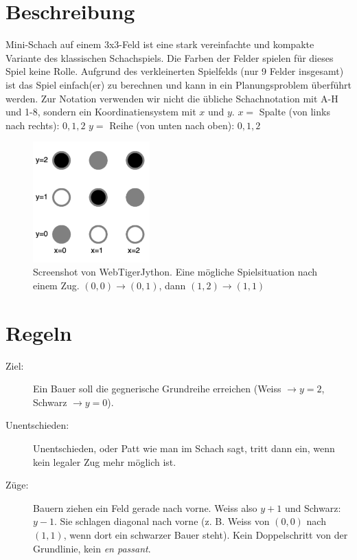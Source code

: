 \documentclass[a4paper,11pt,german,notitlepage]{report}
\begin{document}
\section*{Beschreibung}
Mini-Schach auf einem 3x3-Feld ist eine stark vereinfachte und kompakte Variante des klassischen Schachspiels.
Die Farben der Felder spielen für dieses Spiel keine Rolle.
Aufgrund des verkleinerten Spielfelds (nur 9 Felder insgesamt) ist das Spiel einfach(er) zu berechnen und kann in ein Planungsproblem überführt werden.
Zur Notation verwenden wir nicht die übliche Schachnotation mit A-H und 1-8, sondern ein Koordinatiensystem mit $x$ und $y$.
$x =$ Spalte (von links nach rechts): $0, 1, 2$
$y =$ Reihe (von unten nach oben): $0, 1, 2$

\begin{figure}[h!]
    \centering
    \includegraphics[width=4.5cm]{mini_chess.png}    
    \caption{Screenshot von WebTigerJython. Eine mögliche Spielsituation nach einem Zug. $(0,0) \rightarrow (0,1)$, dann $(1,2) \rightarrow (1,1)$}
\end{figure}

\section*{Regeln}
\begin{description}
    \item[Ziel:] Ein Bauer soll die gegnerische Grundreihe erreichen (Weiss $\rightarrow y = 2$, Schwarz $\rightarrow y = 0$).
    \item[Unentschieden:] Unentschieden, oder Patt wie man im Schach sagt, tritt dann ein, wenn kein legaler Zug mehr möglich ist.
    \item[Züge:] Bauern ziehen ein Feld gerade nach vorne. Weiss also $y + 1$ und Schwarz: $y - 1$. Sie schlagen diagonal nach vorne (z. B. Weiss von $(0,0)$ nach $(1,1)$, wenn dort ein schwarzer Bauer steht). Kein Doppelschritt von der Grundlinie, kein \textit{en passant}.
\end{description}
\end{document}
